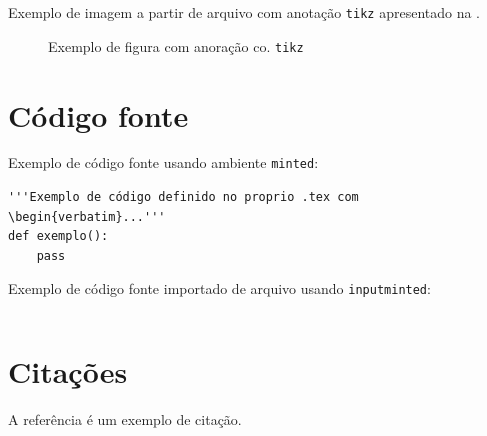 Exemplo de imagem a partir de arquivo com anotação \texttt{tikz} apresentado na .
\begin{figure}[h]
    \centering
    \caption{Exemplo de figura com anoração co. \texttt{tikz}}
    \label{fig:exemplo2}
\end{figure}



\section{Código fonte}
\lipsum[8]

Exemplo de código fonte usando ambiente \texttt{minted}:
\begin{verbatim}
'''Exemplo de código definido no proprio .tex com \begin{verbatim}...'''
def exemplo():
    pass
\end{verbatim}

\lipsum[9-11]

Exemplo de código fonte importado de arquivo usando \texttt{inputminted}:
\inputminted{custompython}{./capitulos/ex_codigo.py}


\section{Citações}
A referência \cite{einstein1905} é um exemplo de citação.

